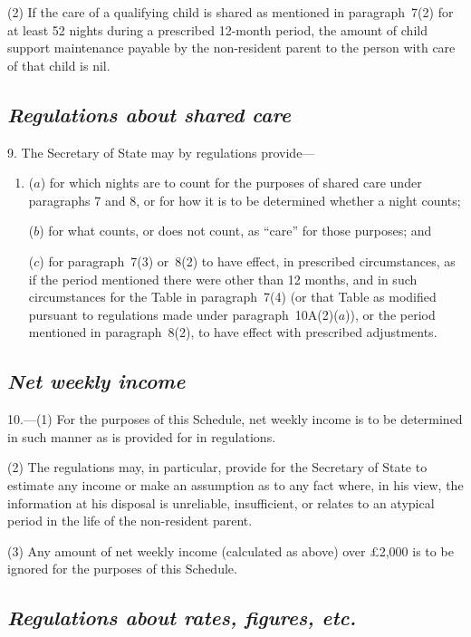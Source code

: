 \documentclass[12pt,a4paper]{article}
\begin{document}
(2) If the care of a qualifying child is shared as mentioned in paragraph~7(2)  for at least 52 nights during a prescribed 12-month period, the amount of child support maintenance payable by the non-resident parent to the person with care of that child is nil.

\subsection*{\itshape Regulations about shared care}

9. The Secretary of State may by regulations provide—
\begin{enumerate}\item[]
($a$) for which nights are to count for the purposes of shared care under paragraphs 7 and 8, or for how it is to be determined whether a night counts;

($b$) for what counts, or does not count, as “care” for those purposes; and

($c$) for paragraph~7(3)  or~8(2)  to have effect, in prescribed circumstances, as if the period mentioned there were other than 12 months, and in such circumstances for the Table in paragraph~7(4)  (or that Table as modified pursuant to regulations made under paragraph~10A(2)($a$)), or the period mentioned in paragraph~8(2), to have effect with prescribed adjustments.
\end{enumerate}

\subsection*{\itshape Net weekly income}

10.---(1) For the purposes of this Schedule, net weekly income is to be determined in such manner as is provided for in regulations.

(2) The regulations may, in particular, provide for the Secretary of State to estimate any income or make an assumption as to any fact where, in his view, the information at his disposal is unreliable, insufficient, or relates to an atypical period in the life of the non-resident parent.

(3) Any amount of net weekly income (calculated as above) over £2,000 is to be ignored for the purposes of this Schedule.

\subsection*{\itshape Regulations about rates, figures, etc.}
\end{document}

